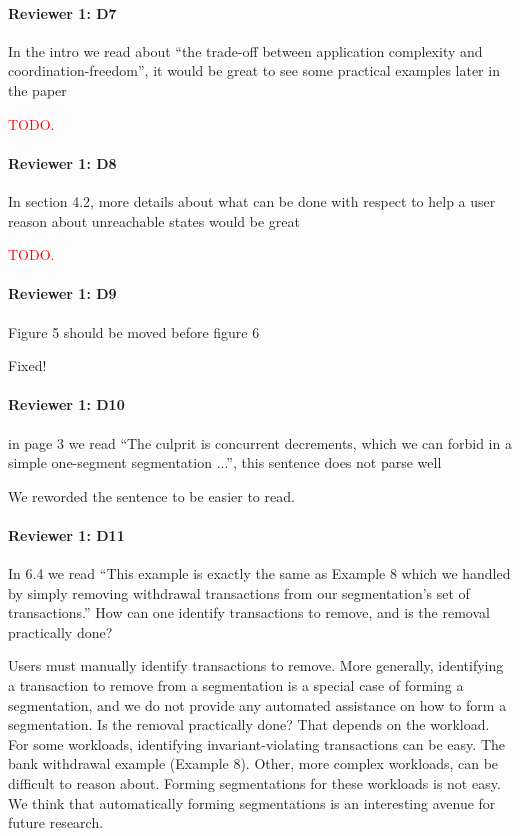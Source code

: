 \documentclass[9pt]{article}
\begin{document}
\begin{multicols*}{2}
\paragraph{Reviewer 1: D7}
\begin{feedback}
  In the intro we read about ``the trade-off between application complexity and
  coordination-freedom'', it would be great to see some practical examples later
  in the paper
\end{feedback}
\textcolor{red}{TODO.}

\paragraph{Reviewer 1: D8}
\begin{feedback}
  In section 4.2, more details about what can be done with respect to help a
  user reason about unreachable states would be great
\end{feedback}
\textcolor{red}{TODO.}

\paragraph{Reviewer 1: D9}
\begin{feedback}
  Figure 5 should be moved before figure 6
\end{feedback}
Fixed!

\paragraph{Reviewer 1: D10}
\begin{feedback}
  in page 3 we read ``The culprit is concurrent decrements, which we can forbid
  in a simple one-segment segmentation ...'', this sentence does not parse well
\end{feedback}
We reworded the sentence to be easier to read.

\paragraph{Reviewer 1: D11}
\begin{feedback}
  In 6.4 we read ``This example is exactly the same as Example 8 which we
  handled by simply removing withdrawal transactions from our segmentation's
  set of transactions.'' How can one identify transactions to remove, and is
  the removal practically done?
\end{feedback}
Users must manually identify transactions to remove. More generally,
identifying a transaction to remove from a segmentation is a special case of
forming a segmentation, and we do not provide any automated assistance on how
to form a segmentation. Is the removal practically done? That depends on the
workload. For some workloads, identifying invariant-violating transactions can
be easy. The bank withdrawal example (Example 8). Other, more complex
workloads, can be difficult to reason about. Forming segmentations for these
workloads is not easy. We think that automatically forming segmentations is an
interesting avenue for future research.


\end{multicols*}
\end{document}
